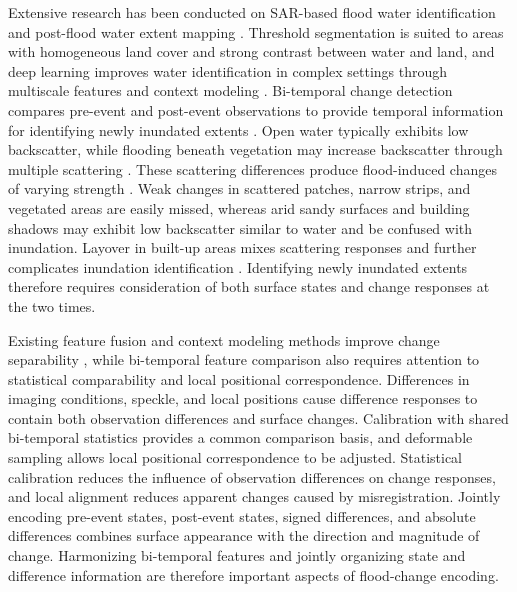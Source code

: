 \documentclass[authoryear,preprint,12pt]{elsarticle}
\begin{document}
Extensive research has been conducted on SAR-based flood water identification and post-flood water extent mapping \citep{jiang2021rapid,lee2026smagnet}. Threshold segmentation is suited to areas with homogeneous land cover and strong contrast between water and land, and deep learning improves water identification in complex settings through multiscale features and context modeling \citep{du2026high}. Bi-temporal change detection compares pre-event and post-event observations to provide temporal information for identifying newly inundated extents \citep{giustarini2013urbanFloodCd}. Open water typically exhibits low backscatter, while flooding beneath vegetation may increase backscatter through multiple scattering \citep{tsyganskaya2018vegetation}. These scattering differences produce flood-induced changes of varying strength \citep{amitrano2024sarFloodReview}. Weak changes in scattered patches, narrow strips, and vegetated areas are easily missed, whereas arid sandy surfaces and building shadows may exhibit low backscatter similar to water and be confused with inundation. Layover in built-up areas mixes scattering responses and further complicates inundation identification \citep{garg2024aridFlood,yu2024urbanFloodThreshold}. Identifying newly inundated extents therefore requires consideration of both surface states and change responses at the two times.

Existing feature fusion and context modeling methods improve change separability \citep{saleh2024dam,du2026high}, while bi-temporal feature comparison also requires attention to statistical comparability and local positional correspondence. Differences in imaging conditions, speckle, and local positions cause difference responses to contain both observation differences and surface changes. Calibration with shared bi-temporal statistics provides a common comparison basis, and deformable sampling \citep{zhu2021deformable} allows local positional correspondence to be adjusted. Statistical calibration reduces the influence of observation differences on change responses, and local alignment reduces apparent changes caused by misregistration. Jointly encoding pre-event states, post-event states, signed differences, and absolute differences combines surface appearance with the direction and magnitude of change. Harmonizing bi-temporal features and jointly organizing state and difference information are therefore important aspects of flood-change encoding.
\end{document}
